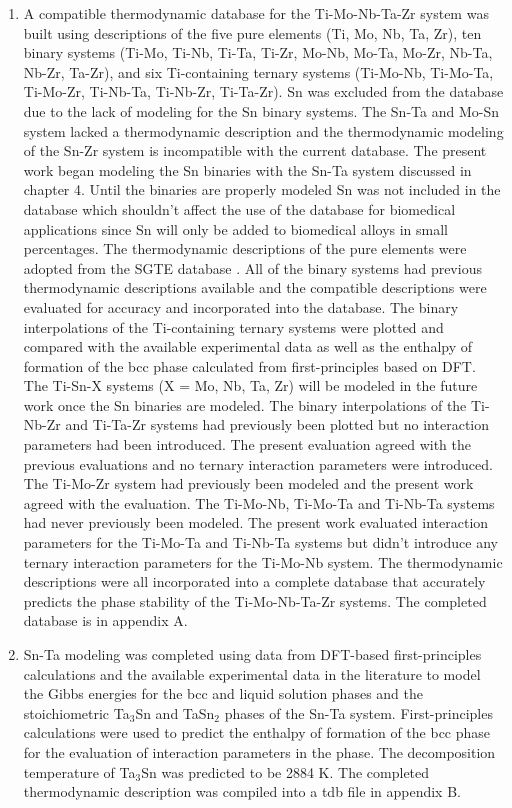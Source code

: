 \begin{enumerate}
	\item A compatible thermodynamic database for the Ti-Mo-Nb-Ta-Zr system was built using descriptions of the five pure elements (Ti, Mo, Nb, Ta, Zr), ten binary systems (Ti-Mo, Ti-Nb, Ti-Ta, Ti-Zr, Mo-Nb, Mo-Ta, Mo-Zr, Nb-Ta, Nb-Zr, Ta-Zr), and six Ti-containing ternary systems (Ti-Mo-Nb, Ti-Mo-Ta, Ti-Mo-Zr, Ti-Nb-Ta, Ti-Nb-Zr, Ti-Ta-Zr). Sn was excluded from the database due to the lack of modeling for the Sn binary systems. The Sn-Ta and Mo-Sn system lacked a thermodynamic description and the thermodynamic modeling of the Sn-Zr system is incompatible with the current database. The present work began modeling the Sn binaries with the Sn-Ta system discussed in chapter 4. Until the binaries are properly modeled Sn was not included in the database which shouldn't affect the use of the database for biomedical applications since Sn will only be added to biomedical alloys in small percentages. The thermodynamic descriptions of the pure elements were adopted from the SGTE database \cite{Dinsdale1991}. All of the binary systems had previous thermodynamic descriptions available and the compatible descriptions were evaluated for accuracy and incorporated into the database. The binary interpolations of the Ti-containing ternary systems were plotted and compared with the available experimental data as well as the enthalpy of formation of the bcc phase calculated from first-principles based on DFT. The Ti-Sn-X systems (X = Mo, Nb, Ta, Zr) will be modeled in the future work once the Sn binaries are modeled. The binary interpolations of the Ti-Nb-Zr and Ti-Ta-Zr systems had previously been plotted but no interaction parameters had been introduced. The present evaluation agreed with the previous evaluations and no ternary interaction parameters were introduced. The Ti-Mo-Zr system had previously been modeled and the present work agreed with the evaluation. The Ti-Mo-Nb, Ti-Mo-Ta and Ti-Nb-Ta systems had never previously been modeled. The present work evaluated interaction parameters for the Ti-Mo-Ta and Ti-Nb-Ta systems but didn't introduce any ternary interaction parameters for the Ti-Mo-Nb system. The thermodynamic descriptions were all incorporated into a complete database that accurately predicts the phase stability of the Ti-Mo-Nb-Ta-Zr systems. The completed database is in appendix A.
	\item Sn-Ta modeling was completed using data from DFT-based first-principles calculations and the available experimental data in the literature to model the Gibbs energies for the bcc and liquid solution phases and the stoichiometric Ta$_3$Sn and TaSn$_2$ phases of the Sn-Ta system. First-principles calculations were used to predict the enthalpy of formation of the bcc phase for the evaluation of interaction parameters in the phase. The decomposition temperature of Ta$_3$Sn was predicted to be 2884 K. The completed thermodynamic description was compiled into a tdb file in appendix B.

\end{enumerate}
